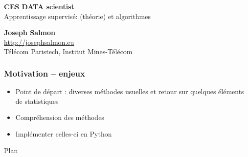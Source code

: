 \documentclass{beamer}
\begin{document}

\begin{frame}
\bigskip
\bigskip 
\begin{center}{
\LARGE\color{marron}
\textbf{CES DATA scientist}\\
\vspace{1cm}
Apprentissage supervisé: (théorie) et algorithmes}
\end{center}
\bigskip
\begin{center}
\textbf{ Joseph Salmon} \\ 
\url{http://josephsalmon.eu} \\
T\'el\'ecom Paristech, Institut Mines-T\'el\'ecom \\
\end{center}

\end{frame}




\begin{frame}
  \frametitle{Motivation -- enjeux}
  \begin{itemize}
  \item Point de départ : diverses m\'ethodes usuelles et retour sur quelques
\'el\'ements de statistiques
\vspace{1cm}
  \item Compr\'ehension des m\'ethodes  
\vspace{1cm} 
  \item Implémenter celles-ci en Python
\vspace{1cm} 
\end{itemize}
\end{frame}

\begin{frame}{Plan}
\tableofcontents[section]
\end{frame}
\end{document}
